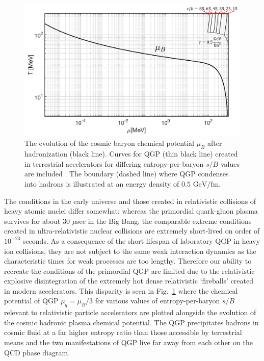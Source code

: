 \documentclass[universe,article,submit,moreauthors,pdftex,a4paper]{Definitions/mdpi}
\newcommand{\GeV}{\text{ GeV}}
\newcommand*{\rf}[1]{Fig.~{\ref{#1}}}
\begin{document}
\begin{figure}[h]
  \centering
  \includegraphics[width=\linewidth]{./phaseQGP}
  \caption{The evolution of the cosmic baryon chemical potential $\mu_{B}$ after hadronization (black line). Curves for QGP (thin black line) created in terrestrial accelerators for differing entropy-per-baryon $s/B$ values are included \cite{Rafelski:1987nv}. The boundary (dashed line) where QGP condenses into hadrons is illustrated at an energy density of $0.5\GeV/\mathrm{fm}$.}
  \label{phaseQGP} 
\end{figure}


The conditions in the early universe and those created in relativistic collisions of heavy atomic nuclei differ somewhat: whereas the primordial quark-gluon plasma survives for about 30 $\mu$sec in the Big Bang, the comparable extreme conditions created in ultra-relativistic nuclear collisions are extremely short-lived \cite{Rafelski:2001hp} on order of $10^{-23}$ seconds. As a consequence of the short lifespan of laboratory QGP in heavy ion collisions, they are not subject to the same weak interaction dynamics as the characteristic times for weak processes are too lengthy. Therefore our ability to recreate the conditions of the primordial QGP are limited due to the relativistic explosive disintegration of the extremely hot dense relativistic `fireballs' created in modern accelerators. This disparity is seen in \rf{phaseQGP} where the chemical potential of QGP $\mu_{q}=\mu_{B}/3$ for various values of entropy-per-baryon $s/B$ relevant to relativistic particle accelerators are plotted alongside the evolution of the cosmic hadronic plasma chemical potential. The QGP precipitates hadrons in cosmic fluid at a far higher entropy ratio than those accessible by terrestrial means and the two manifestations of QGP live far away from each other on the QCD phase diagram.
\end{document}
